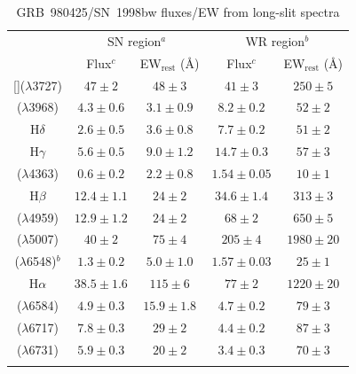 \documentclass[traditabstract]{aa}
\newcommand{\sii}{[\ion{S}{ii}]}
\newcommand{\oii}{[\ion{O}{ii}]}
\newcommand{\oiii}{[\ion{O}{iii}]}
\newcommand{\neiii}{[\ion{Ne}{iii}]}
\newcommand{\nii}{[\ion{N}{ii}]}
\begin{document}
\begin{appendix}
\begin{table}[!ht]
\caption{GRB~980425/SN~1998bw fluxes/EW from long-slit spectra\label{tab:fluxes}}
\centering
\begin{tabular}{ccccc}
\hline
\hline\noalign{\smallskip}
 &  \multicolumn{2}{c}{SN region$^{a}$} &  \multicolumn{2}{c}{WR region$^{b}$}  \\
 &  Flux$^{c}$ & EW$_{\mathrm{rest}}$ (\AA)  & Flux$^{c}$ & EW$_{\mathrm{rest}}$ (\AA) \\

\hline\noalign{\smallskip}

\oii($\lambda$3727)  & $47\pm2$ & $48\pm3$ & $41\pm3$ & $250\pm5$ \\
\neiii($\lambda$3968)& $4.3\pm0.6$ & $3.1\pm0.9$ & $8.2\pm0.2$ & $52\pm2$ \\
H$\delta$            & $2.6\pm0.5$ & $3.6\pm0.8$ & $7.7\pm0.2$ & $51\pm2$ \\
H$\gamma$            & $5.6\pm0.5$ & $9.0\pm1.2$ & $14.7\pm0.3$ & $57\pm3$ \\
\oiii($\lambda$4363) & $0.6\pm0.2$ & $2.2\pm0.8$ & $1.54\pm0.05$ & $10\pm1$ \\
H$\beta$             & $12.4\pm1.1$ & $24\pm2$ & $34.6\pm1.4$ & $313\pm3$ \\
\oiii($\lambda$4959) & $12.9\pm1.2$ & $24\pm2$ & $68\pm2$ & $650\pm5$ \\
\oiii($\lambda$5007) & $40\pm2$ & $75\pm4$ & $205\pm4$ & $1980\pm20$ \\
\hline
\hline
\nii($\lambda$6548)$^{b}$  & $1.3\pm0.2$ & $5.0\pm1.0$ & $1.57\pm0.03$ & $25\pm1$ \\
H$\alpha$            & $38.5\pm1.6$ & $115\pm6$ & $77\pm2$ & $1220\pm20$ \\
\nii($\lambda$6584)  & $4.9 \pm 0.3$ & $15.9\pm1.8$ & $4.7\pm0.2$ & $79\pm3$ \\
\sii($\lambda$6717)  & $7.8 \pm 0.3$ & $29\pm2$ & $4.4\pm0.2$ & $87\pm3$ \\
\sii($\lambda$6731)  & $5.9 \pm 0.3$ & $20\pm2$ & $3.4\pm0.3$ & $70\pm3$ \\
\hline\noalign{\smallskip}
\end{tabular}

\end{table}


\end{appendix}
\end{document}
